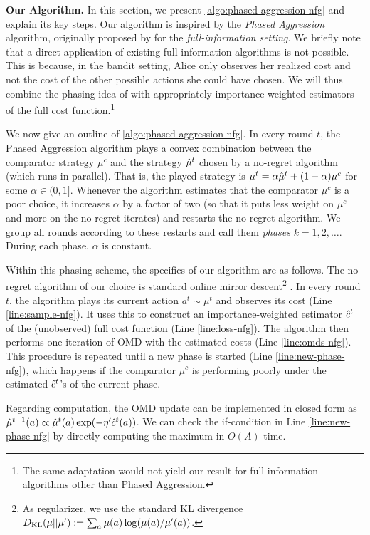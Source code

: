 \documentclass[11pt]{article}
\begin{document}
\textbf{Our Algorithm.} In this section, we present \cref{algo:phased-aggression-nfg} and explain its key steps. Our algorithm is inspired by the \emph{Phased Aggression} algorithm, originally proposed by \citet{even2008regret} for the \textit{full-information setting}. We briefly note that a direct application of existing full-information algorithms is not possible. This is because, in the bandit setting, Alice only observes her realized cost and not the cost of the other possible actions she could have chosen. We will thus combine the phasing idea of \citet{even2008regret} with appropriately importance-weighted estimators of the full cost function.\footnote{The same adaptation would not yield our result for full-information algorithms other than Phased Aggression.} 

We now give an outline of \cref{algo:phased-aggression-nfg}. In every round $t$, the Phased Aggression algorithm plays a convex combination between the comparator strategy $\mu^c$ and the strategy $\hat{\mu}^t$ chosen by a no-regret algorithm (which runs in parallel). That is, the played strategy is $\mu^t=\alpha\hat{\mu}^t+(1-\alpha)\mu^c$ for some $\alpha \in (0,1]$. Whenever the algorithm estimates that the comparator $\mu^c$ is a poor choice, it increases $\alpha$ by a factor of two (so that it puts less weight on $\mu^c$ and more on the no-regret iterates) and restarts the no-regret algorithm. We group all rounds according to these restarts and call them \emph{phases} $k=1,2,\dots$. During each phase, $\alpha$ is constant.

Within this phasing scheme, the specifics of our algorithm are as follows. The no-regret algorithm of our choice is standard online mirror descent\footnote{As regularizer, we use the standard KL divergence $D_{\text{KL}}(\mu||\mu'):=\sum_a \mu(a)\log(\mu(a)/\mu'(a))$.} \citep[OMD]{H17}. In every round $t$, the algorithm plays its current action $a^t \sim \mu^t$ and observes its cost (Line \ref{line:sample-nfg}). It uses this to construct an importance-weighted estimator $\hat{c}^t$ of the (unobserved) full cost function (Line \ref{line:loss-nfg}). The algorithm then performs one iteration of OMD with the estimated costs (Line \ref{line:omds-nfg}). This procedure is repeated until a new phase is started (Line \ref{line:new-phase-nfg}), which happens if the comparator $\mu^c$ is performing poorly under the estimated $\hat{c}^t$'s of the current phase.

Regarding computation, the OMD update can be implemented in closed form as $\hat{\mu}^{t+1}(a)\propto \hat{\mu}^{t}(a)\exp(-\eta' \hat{c}^t(a))$. We can check the if-condition in Line \ref{line:new-phase-nfg} by directly computing the maximum in $O(A)$ time.
\end{document}
